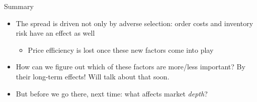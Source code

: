 \documentclass[english,10pt
,aspectratio=169
]{beamer}
\begin{document}
%




\begin{frame}{Summary}
	\begin{itemize}
		\item The spread is driven not only by adverse selection: order costs and inventory risk have an effect as well
		\begin{itemize}
			\item Price efficiency is lost once these new factors come into play
		\end{itemize}
		\item How can we figure out which of these factors are more/less important? By their long-term effects! Will talk about that soon.
		\item But before we go there, next time: what affects market \emph{depth}?
	\end{itemize}
\end{frame}
\end{document}
